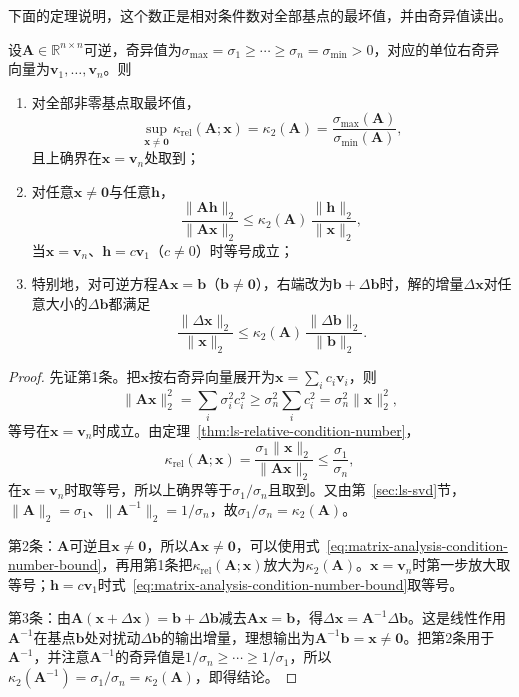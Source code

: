 下面的定理说明，这个数正是相对条件数对全部基点的最坏值，并由奇异值读出。
\begin{theorem}[条件数是相对条件数的最坏值]
\label{thm:matrix-analysis-condition-number-bound}
设$\bm A\in\mathbb R^{n\times n}$可逆，奇异值为$\sigma_{\max}=\sigma_1\geq\cdots\geq\sigma_n=\sigma_{\min}>0$，对应的单位右奇异向量为$\bm v_1,\ldots,\bm v_n$。则
\begin{enumerate}
 \item 对全部非零基点取最坏值，
 \begin{equation}
  \sup_{\bm x\neq\bm0}\kappa_{\mathrm{rel}}(\bm A;\bm x)
  =\kappa_2(\bm A)
  =\frac{\sigma_{\max}(\bm A)}{\sigma_{\min}(\bm A)},
  \label{eq:matrix-analysis-spectral-condition-number}
 \end{equation}
 且上确界在$\bm x=\bm v_n$处取到；
 \item 对任意$\bm x\neq\bm0$与任意$\bm h$，
 \[
  \frac{\lVert\bm A\bm h\rVert_2}{\lVert\bm A\bm x\rVert_2}
  \leq\kappa_2(\bm A)\,\frac{\lVert\bm h\rVert_2}{\lVert\bm x\rVert_2},
 \]
 当$\bm x=\bm v_n$、$\bm h=c\bm v_1$（$c\neq0$）时等号成立；
 \item 特别地，对可逆方程$\bm A\bm x=\bm b$（$\bm b\neq\bm0$），右端改为$\bm b+\Delta\bm b$时，解的增量$\Delta\bm x$对任意大小的$\Delta\bm b$都满足
 \[
  \frac{\lVert\Delta\bm x\rVert_2}{\lVert\bm x\rVert_2}
  \leq\kappa_2(\bm A)\,\frac{\lVert\Delta\bm b\rVert_2}{\lVert\bm b\rVert_2}.
 \]
\end{enumerate}
\end{theorem}
\begin{proof}
先证第1条。把$\bm x$按右奇异向量展开为$\bm x=\sum_ic_i\bm v_i$，则
\[
 \lVert\bm A\bm x\rVert_2^2=\sum_i\sigma_i^2c_i^2\geq\sigma_n^2\sum_ic_i^2=\sigma_n^2\lVert\bm x\rVert_2^2 ,
\]
等号在$\bm x=\bm v_n$时成立。由定理~\ref{thm:ls-relative-condition-number}，
\[
 \kappa_{\mathrm{rel}}(\bm A;\bm x)=\frac{\sigma_1\lVert\bm x\rVert_2}{\lVert\bm A\bm x\rVert_2}\leq\frac{\sigma_1}{\sigma_n},
\]
在$\bm x=\bm v_n$时取等号，所以上确界等于$\sigma_1/\sigma_n$且取到。又由第~\ref{sec:ls-svd}节，$\lVert\bm A\rVert_2=\sigma_1$、$\lVert\bm A^{-1}\rVert_2=1/\sigma_n$，故$\sigma_1/\sigma_n=\kappa_2(\bm A)$。

第2条：$\bm A$可逆且$\bm x\neq\bm0$，所以$\bm A\bm x\neq\bm0$，可以使用式~\eqref{eq:matrix-analysis-condition-number-bound}，再用第1条把$\kappa_{\mathrm{rel}}(\bm A;\bm x)$放大为$\kappa_2(\bm A)$。$\bm x=\bm v_n$时第一步放大取等号；$\bm h=c\bm v_1$时式~\eqref{eq:matrix-analysis-condition-number-bound}取等号。

第3条：由$\bm A(\bm x+\Delta\bm x)=\bm b+\Delta\bm b$减去$\bm A\bm x=\bm b$，得$\Delta\bm x=\bm A^{-1}\Delta\bm b$。这是线性作用$\bm A^{-1}$在基点$\bm b$处对扰动$\Delta\bm b$的输出增量，理想输出为$\bm A^{-1}\bm b=\bm x\neq\bm0$。把第2条用于$\bm A^{-1}$，并注意$\bm A^{-1}$的奇异值是$1/\sigma_n\geq\cdots\geq1/\sigma_1$，所以$\kappa_2(\bm A^{-1})=\sigma_1/\sigma_n=\kappa_2(\bm A)$，即得结论。
\end{proof}
